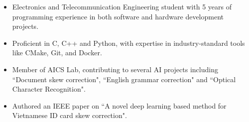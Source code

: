 
\begin{cvparagraph}
  \begin{itemize}
    \item Electronics and Telecommunication Engineering student with 5 years of programming experience in both software and hardware development projects.
    \item Proficient in C, C++ and Python, with expertise in industry-standard tools like CMake, Git, and Docker.
    \item Member of AICS Lab, contributing to several AI projects including ``Document skew correction", ``English grammar correction" and ``Optical Character Recognition".
    \item Authored an IEEE paper on ``A novel deep learning based method for Vietnamese ID card skew correction".
  \end{itemize}


\end{cvparagraph}
